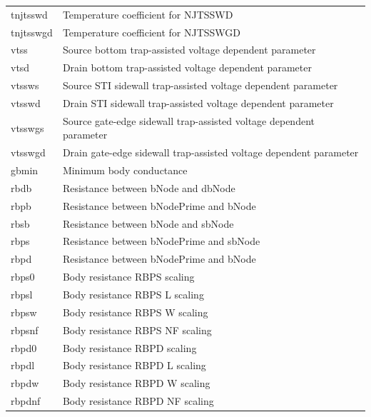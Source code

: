 \begin{longtable}{l l}
{\small tnjtsswd} & {\small Temperature coefficient for NJTSSWD} \\
{\small tnjtsswgd} & {\small Temperature coefficient for NJTSSWGD} \\
{\small vtss} & {\small Source bottom trap-assisted voltage dependent parameter} \\
{\small vtsd} & {\small Drain bottom trap-assisted voltage dependent parameter} \\
{\small vtssws} & {\small Source STI sidewall trap-assisted voltage dependent parameter} \\
{\small vtsswd} & {\small Drain STI sidewall trap-assisted voltage dependent parameter} \\
{\small vtsswgs} & {\small Source gate-edge sidewall trap-assisted voltage dependent parameter} \\
{\small vtsswgd} & {\small Drain gate-edge sidewall trap-assisted voltage dependent parameter} \\

{\small gbmin} & {\small Minimum body conductance} \\
{\small rbdb} & {\small Resistance between bNode and dbNode} \\
{\small rbpb} & {\small Resistance between bNodePrime and bNode} \\
{\small rbsb} & {\small Resistance between bNode and sbNode} \\
{\small rbps} & {\small Resistance between bNodePrime and sbNode} \\
{\small rbpd} & {\small Resistance between bNodePrime and bNode} \\

{\small rbps0} & {\small Body resistance RBPS scaling} \\
{\small rbpsl} & {\small Body resistance RBPS L scaling} \\
{\small rbpsw} & {\small Body resistance RBPS W scaling} \\
{\small rbpsnf} & {\small Body resistance RBPS NF scaling} \\

{\small rbpd0} & {\small Body resistance RBPD scaling} \\
{\small rbpdl} & {\small Body resistance RBPD L scaling} \\
{\small rbpdw} & {\small Body resistance RBPD W scaling} \\
{\small rbpdnf} & {\small Body resistance RBPD NF scaling} \\


\end{longtable}

